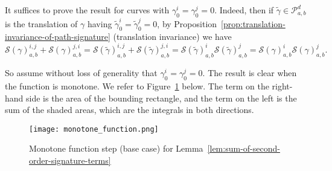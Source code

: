 \documentclass{amsart}[11pt]
\numberwithin{equation}{section}
\theoremstyle{definition}
\newcommand{\Pp}{\mathcal{P}}
\newcommand{\Ss}{\mathcal{S}}
\newcommand{\Pab}{\Pp_{a,b}^{d}}
\begin{document}
\small{
It suffices to prove the result for curves with $\gamma^i_0 = \gamma^j_0 = 0$.
Indeed, then if $\widetilde{\gamma}\in\Pab$ is the translation of $\gamma$ having $\widetilde{\gamma}^i_0 = \widetilde{\gamma}^j_0 = 0$, by Proposition~\ref{prop:translation-invariance-of-path-signature} (translation invariance) we have
$$
\Ss(\gamma)^{i, j}_{a,b} + \Ss(\gamma)^{j, i}_{a,b} = \Ss(\widetilde{\gamma})^{i, j}_{a,b} + \Ss(\widetilde{\gamma})^{j, i}_{a,b} = \Ss(\widetilde{\gamma})^{i}_{a,b} \Ss(\widetilde{\gamma})^{j}_{a,b} = \Ss(\gamma)^{i}_{a,b}\Ss(\gamma)^{j}_{a,b}.
$$

So assume without loss of generality that $\gamma^i_0 = \gamma^j_0 = 0$.
The result is clear when the function is monotone. 
We refer to Figure~\ref{fig:monotone-function} below. 
The term on the right-hand side is the area of the bounding rectangle, and the term on the left is the sum of the shaded areas, which are the integrals in both directions.
\begin{figure}[h!]
    \centering
    \texttt{[image: monotone\_function.png]}
    \caption{Monotone function step (base case) for Lemma~\ref{lem:sum-of-second-order-signature-terms}}
    \label{fig:monotone-function}
\end{figure}

}
\end{document}
